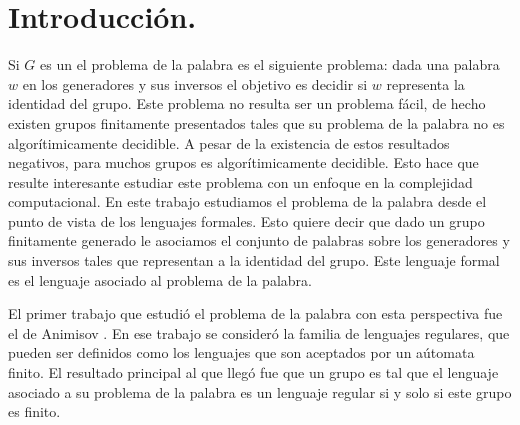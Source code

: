 \documentclass[tesis.tex]{subfiles}
\begin{document}
	\chapter*{Introducción.}
	
	Si $G$ es un \fg el problema de la palabra es el siguiente problema: dada una palabra $w$ en los generadores y sus inversos el objetivo es decidir si $w$ representa la identidad del grupo.
	Este problema no resulta ser un problema fácil, de hecho existen grupos finitamente presentados tales que su problema de la palabra no es algorítimicamente decidible.
	A pesar de la existencia de estos resultados negativos, para muchos grupos es algorítimicamente decidible.
	Esto hace que resulte interesante estudiar este problema con un enfoque en la complejidad computacional.
	En este trabajo estudiamos el problema de la palabra desde el punto de vista de los lenguajes formales.
	Esto quiere decir que dado un grupo finitamente generado le asociamos el conjunto de palabras sobre los generadores y sus inversos tales que representan a la identidad del grupo.
	Este lenguaje formal es el lenguaje asociado al problema de la palabra.


	
	El primer trabajo que estudió el problema de la palabra con esta perspectiva fue el de Animisov \cite{anisimov1971languages}. 
	En ese trabajo se consideró la familia de lenguajes regulares, que pueden ser definidos como los lenguajes que son aceptados por un aútomata finito.
	El resultado principal al que llegó fue que un grupo es tal que el lenguaje asociado a su problema de la palabra es un lenguaje regular si y solo si este grupo es finito.
		
\end{document}
